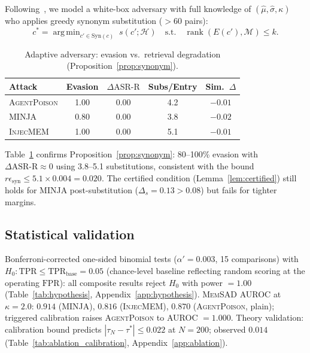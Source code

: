 \documentclass{article}
\theoremstyle{definition}
\newcommand{\asrr}{\text{ASR-R}}
\newcommand{\tpr}{\text{TPR}}
\newcommand{\fpr}{\text{FPR}}
\newcommand{\cM}{\mathcal{M}}
\newcommand{\cH}{\mathcal{H}}
\newcommand{\memsad}{\textnormal{\textsc{MemSAD}}}
\newcommand{\agentpoison}{\textsc{AgentPoison}}
\newcommand{\minja}{\textsc{MINJA}}
\newcommand{\injecmem}{\textsc{InjecMEM}}
\newcommand{\enc}{E}
\DeclareMathOperator*{\argmin}{arg\,min}
\DeclareMathOperator{\rank}{rank}
\begin{document}
Following~\citet{tramer2020adaptive}, we model a white-box adversary with full knowledge of $(\hat{\mu}, \hat{\sigma}, \kappa)$ who applies greedy synonym substitution ($>60$ pairs):
\begin{equation}
  c^* = \argmin_{c' \in \mathrm{Syn}(c)}\; s(c'; \cH) \quad \text{s.t.} \quad \rank(\enc(c'), \cM) \leq k.
  \label{eq:adaptive_obj}
\end{equation}

\begin{table}[t]
  \centering
  \small
  \caption{Adaptive adversary: evasion vs.\ retrieval degradation (Proposition~\ref{prop:synonym}).}
  \label{tab:adaptive_sad}
  \vspace{2pt}
  \begin{tabular}{lcccc}
    \toprule
    Attack & Evasion & $\Delta\asrr$ & Subs/Entry & Sim.\ $\Delta$ \\
    \midrule
    \agentpoison{} & 1.00 & 0.00 & 4.2 & $-0.01$ \\
    \minja{}        & 0.80 & 0.00 & 3.8 & $-0.02$ \\
    \injecmem{}     & 1.00 & 0.00 & 5.1 & $-0.01$ \\
    \bottomrule
  \end{tabular}
  \vspace{-4pt}
\end{table}

Table~\ref{tab:adaptive_sad} confirms Proposition~\ref{prop:synonym}: 80--100\% evasion with $\Delta\asrr \approx 0$ using 3.8--5.1 substitutions, consistent with the bound $r\epsilon_{\text{syn}} \leq 5.1 \times 0.004 = 0.020$.
The certified condition (Lemma~\ref{lem:certified}) still holds for \minja{} post-substitution ($\Delta_s = 0.13 > 0.08$) but fails for tighter margins.

\subsection{Statistical validation}

Bonferroni-corrected one-sided binomial tests ($\alpha' = 0.003$, 15 comparisons) with $H_0: \tpr \leq \tpr_{\text{base}} = 0.05$ (chance-level baseline reflecting random scoring at the operating $\fpr$): all composite results reject $H_0$ with power $= 1.00$ (Table~\ref{tab:hypothesis}, Appendix~\ref{app:hypothesis}).
\memsad{} AUROC at $\kappa = 2.0$: $0.914$ (\minja{}), $0.816$ (\injecmem{}), $0.870$ (\agentpoison{}, plain); triggered calibration raises \agentpoison{} to AUROC $= 1.000$.
Theory validation: calibration bound predicts $|\tau_N - \tau^*| \leq 0.022$ at $N = 200$; observed $0.014$ (Table~\ref{tab:ablation_calibration}, Appendix~\ref{app:ablation}).
\end{document}
